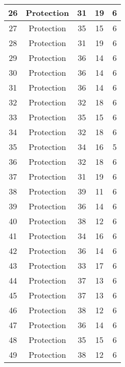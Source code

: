 \documentclass[results.tex]{subfiles}
\begin{document}
\begin{center}
\begin{tabular}{| c || c | c | c | c |}
    \hline
    26 & Protection & 31 & 19 & 6 \\ 
    \hline
    27 & Protection & 35 & 15 & 6 \\ 
    \hline
    28 & Protection & 31 & 19 & 6 \\ 
    \hline
    29 & Protection & 36 & 14 & 6 \\ 
    \hline
    30 & Protection & 36 & 14 & 6 \\ 
    \hline
    31 & Protection & 36 & 14 & 6 \\ 
    \hline
    32 & Protection & 32 & 18 & 6 \\ 
    \hline
    33 & Protection & 35 & 15 & 6 \\ 
    \hline
    34 & Protection & 32 & 18 & 6 \\ 
    \hline
    35 & Protection & 34 & 16 & 5 \\ 
    \hline
    36 & Protection & 32 & 18 & 6 \\ 
    \hline
    37 & Protection & 31 & 19 & 6 \\ 
    \hline
    38 & Protection & 39 & 11 & 6 \\ 
    \hline
    39 & Protection & 36 & 14 & 6 \\ 
    \hline
    40 & Protection & 38 & 12 & 6 \\ 
    \hline
    41 & Protection & 34 & 16 & 6 \\ 
    \hline
    42 & Protection & 36 & 14 & 6 \\ 
    \hline
    43 & Protection & 33 & 17 & 6 \\ 
    \hline
    44 & Protection & 37 & 13 & 6 \\ 
    \hline
    45 & Protection & 37 & 13 & 6 \\ 
    \hline
    46 & Protection & 38 & 12 & 6 \\ 
    \hline
    47 & Protection & 36 & 14 & 6 \\ 
    \hline
    48 & Protection & 35 & 15 & 6 \\ 
    \hline
    49 & Protection & 38 & 12 & 6 \\ 
    \hline   \end{tabular}
\end{center}
\end{document}
